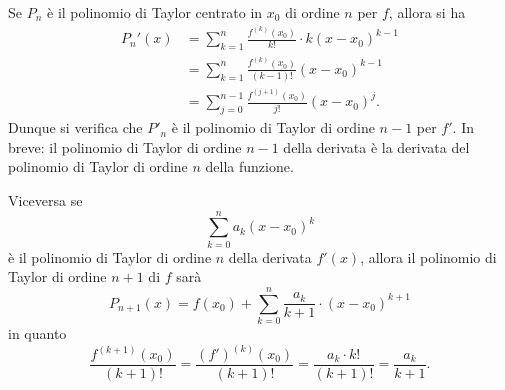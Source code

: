 \begin{remark}
  \label{rem:taylor_derivata}%
Se $P_n$ è il polinomio di Taylor centrato in $x_0$ di ordine $n$ per $f$, allora
si ha
\begin{align*}
P_n'(x) &= \sum_{k=1}^{n} \frac{f^{(k)}(x_0)}{k!}\cdot k(x-x_0)^{k-1} \\
  &= \sum_{k=1}^{n} \frac{f^{(k)}(x_0)}{(k-1)!} (x-x_0)^{k-1} \\
  &= \sum_{j=0}^{n-1} \frac{f^{(j+1)}(x_0)}{j!} (x-x_0)^j.
\end{align*}
Dunque si verifica che $P'_n$ è il polinomio di Taylor di ordine $n-1$ per $f'$.
In breve: il polinomio di Taylor di ordine $n-1$ della derivata è la derivata
del polinomio di Taylor di ordine $n$ della funzione.

Viceversa se
\[
   \sum_{k=0}^n a_k (x-x_0)^k
\]
è il polinomio di Taylor di ordine $n$ della derivata $f'(x)$, allora
il polinomio di Taylor di ordine $n+1$ di $f$ sarà%
\begin{equation}\label{eq:4993725}
  P_{n+1}(x) = f(x_0) + \sum_{k=0}^{n} \frac{a_{k}}{k+1}\cdot (x-x_0)^{k+1}
\end{equation}
in quanto
\[
  \frac{f^{(k+1)}(x_0)}{(k+1)!}
  =\frac{(f')^{(k)}(x_0)}{(k+1)!}
  = \frac{a_k \cdot k!}{ (k+1)!}
  = \frac{a_k}{k+1}.
\]
\end{remark}

